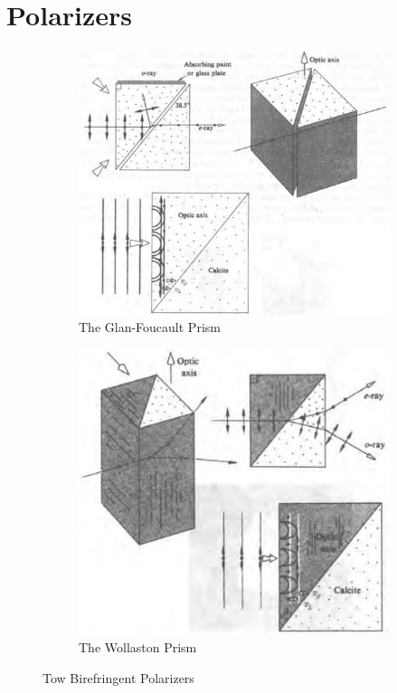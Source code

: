 \section{Polarizers}

\begin{figure}[H]
  \centering
  \begin{subfigure}{.5\textwidth}
    \centering
    \includegraphics[width=0.75\linewidth]{figures/Polarizer1}
    \caption{The Glan-Foucault Prism}
    \label{fig:}
  \end{subfigure}%
  \begin{subfigure}{.5\textwidth}
    \centering
    \includegraphics[width=0.75\linewidth]{figures/Polarizer2}
    \caption{The Wollaston Prism}
    \label{fig:}
  \end{subfigure}
  \caption{Tow Birefringent Polarizers}
  \label{fig:}
\end{figure}

